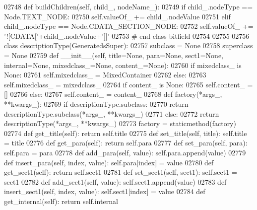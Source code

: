 \begin{DoxyCode}
{{{{{{{{{{{{{{{{{{{{{{{{{{{{{{{{{{{{{{{{{{{{{{{{{{{{{{{{{{{{{{{{{{{{{{{{{{{{{{{{{{{{{{{{{{{{{{{{{{{{{{{{{{{{{{{{{{{{{{{{{{{{{{{{{{{{{{{{{{{{{{{{{{{{{{{{{{{{{{{{{{{{{{{{{{{{{{{{{{{{{{{{{{{{{{{{{{{02748     \textcolor{keyword}{def }buildChildren(self, child\_, nodeName\_):
02749         \textcolor{keywordflow}{if} child\_.nodeType == Node.TEXT\_NODE:
02750             self.valueOf\_ += child\_.nodeValue
02751         \textcolor{keywordflow}{elif} child\_.nodeType == Node.CDATA\_SECTION\_NODE:
02752             self.valueOf\_ += \textcolor{stringliteral}{'![CDATA['}+child\_.nodeValue+\textcolor{stringliteral}{']]'}
02753 \textcolor{comment}{# end class bitfield}
02754 
02755 
02756 \textcolor{keyword}{class }descriptionType(GeneratedsSuper):
02757     subclass = \textcolor{keywordtype}{None}
02758     superclass = \textcolor{keywordtype}{None}
02759     \textcolor{keyword}{def }__init__(self, title=None, para=None, sect1=None, internal=None, mixedclass\_=None, content\_=None):
02760         \textcolor{keywordflow}{if} mixedclass\_ \textcolor{keywordflow}{is} \textcolor{keywordtype}{None}:
02761             self.mixedclass_ = MixedContainer
02762         \textcolor{keywordflow}{else}:
02763             self.mixedclass_ = mixedclass\_
02764         \textcolor{keywordflow}{if} content\_ \textcolor{keywordflow}{is} \textcolor{keywordtype}{None}:
02765             self.content_ = []
02766         \textcolor{keywordflow}{else}:
02767             self.content_ = content\_
02768     \textcolor{keyword}{def }factory(*args\_, **kwargs\_):
02769         \textcolor{keywordflow}{if} descriptionType.subclass:
02770             \textcolor{keywordflow}{return} descriptionType.subclass(*args\_, **kwargs\_)
02771         \textcolor{keywordflow}{else}:
02772             \textcolor{keywordflow}{return} descriptionType(*args\_, **kwargs\_)
02773     factory = staticmethod(factory)
02774     \textcolor{keyword}{def }get_title(self): \textcolor{keywordflow}{return} self.title
02775     \textcolor{keyword}{def }set_title(self, title): self.title = title
02776     \textcolor{keyword}{def }get_para(self): \textcolor{keywordflow}{return} self.para
02777     \textcolor{keyword}{def }set_para(self, para): self.para = para
02778     \textcolor{keyword}{def }add_para(self, value): self.para.append(value)
02779     \textcolor{keyword}{def }insert_para(self, index, value): self.para[index] = value
02780     \textcolor{keyword}{def }get_sect1(self): \textcolor{keywordflow}{return} self.sect1
02781     \textcolor{keyword}{def }set_sect1(self, sect1): self.sect1 = sect1
02782     \textcolor{keyword}{def }add_sect1(self, value): self.sect1.append(value)
02783     \textcolor{keyword}{def }insert_sect1(self, index, value): self.sect1[index] = value
02784     \textcolor{keyword}{def }get_internal(self): \textcolor{keywordflow}{return} self.internal
}}}}}}}}}}}}}}}}}}}}}}}}}}}}}}}}}}}}}}}}}}}}}}}}}}}}}}}}}}}}}}}}}}}}}}}}}}}}}}}}}}}}}}}}}}}}}}}}}}}}}}}}}}}}}}}}}}}}}}}}}}}}}}}}}}}}}}}}}}}}}}}}}}}}}}}}}}}}}}}}}}}}}}}}}}}}}}}}}}}}}}}}}}}}}}}}}}}
\end{DoxyCode}
